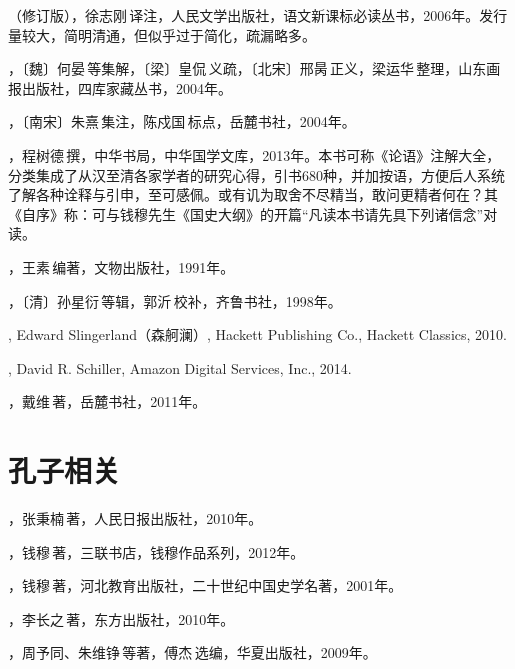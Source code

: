（修订版），徐志刚\,译注，人民文学出版社，语文新课标必读丛书，2006年。发行量较大，简明清通，但似乎过于简化，疏漏略多。

，〔魏〕何晏\,等集解，〔梁〕皇侃\,义疏，〔北宋〕邢昺\,正义，梁运华\,整理，山东画报出版社，四库家藏丛书，2004年。

，〔南宋〕朱熹\,集注，陈戍国\,标点，岳麓书社，2004年。

，程树德\,撰，中华书局，中华国学文库，2013年。本书可称《论语》注解大全，分类集成了从汉至清各家学者的研究心得，引书680种，并加按语，方便后人系统了解各种诠释与引申，至可感佩。或有讥为取舍不尽精当，敢问更精者何在？其《自序》称：可与钱穆先生《国史大纲》的开篇“凡读本书请先具下列诸信念”对读。

，王素\,编著，文物出版社，1991年。

，〔清〕孙星衍\,等辑，郭沂\,校补，齐鲁书社，1998年。

, Edward Slingerland（森舸澜）, Hackett Publishing Co., Hackett Classics, 2010.

, David R. Schiller, Amazon Digital Services, Inc., 2014.

，戴维\,著，岳麓书社，2011年。


\lypdfbookmark\section*{孔子相关}

，张秉楠\,著，人民日报出版社，2010年。

，钱穆\,著，三联书店，钱穆作品系列，2012年。

，钱穆\,著，河北教育出版社，二十世纪中国史学名著，2001年。

，李长之\,著，东方出版社，2010年。

，周予同、朱维铮\,等著，傅杰\,选编，华夏出版社，2009年。

